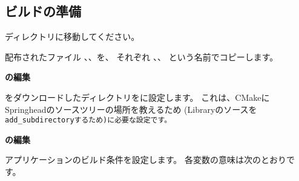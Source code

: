 \subsection{ビルドの準備}
\label{subsec:PreparationForApp}
\parindent=0pt

ディレクトリ\AppTop{}に移動してください。

配布されたファイル
、、を、
それぞれ
\QCMakeTopdir{}、\CMakeLists{}、\QCMakeSettings{}
という名前でコピーします。


\medskip
{}

\bigskip
\bf{\QCMakeTopdir{}}の編集

\medskip
\SprLib{}をダウンロードしたディレクトリを\QCMakeTopdir{}に設定します。
これは、CMakeにSpringheadのソースツリーの場所を教えるため
(Libraryのソースを\tt{add\_subdirectory}するため)に必要な設定です。


\bigskip
\bf{\QCMakeSettings{}}の編集

\medskip
アプリケーションのビルド条件を設定します。 各変数の意味は次のとおりです。

\def\SetRelPath{\tt{RELATIVE \$\{CMAKE\_SOURCE\_DIR\}}}
\def\CMakeSrcDir{\tt{\$\{CMAKE\_SOURCE\_DIR\}}}

\def\HLine{\cline{2-3}}
\def\Width{255pt}
	
